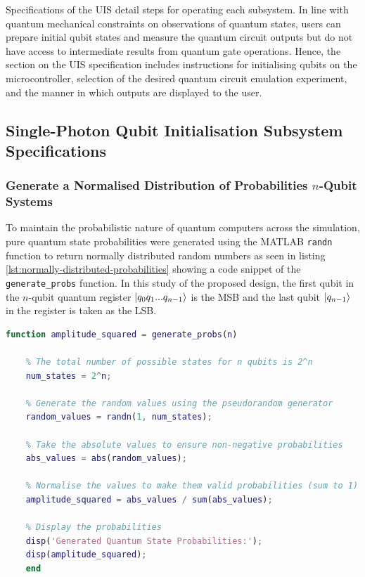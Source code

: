 Specifications of the UIS detail steps for operating each subsystem. In line with quantum mechanical constraints on observations of quantum states, users can prepare initial qubit states and measure the quantum circuit outputs but do not have access to intermediate results from quantum gate operations. Hence, the section on the UIS specification includes instructions for initialising qubits on the microcontroller, selection of the desired quantum circuit emulation experiment, and the manner in which outputs are displayed to the user. 

\subsection{Single-Photon Qubit Initialisation Subsystem Specifications \label{subsec:sqpis-specs}}

\subsubsection{Generate a Normalised Distribution of Probabilities $n$-Qubit Systems}

To maintain the probabilistic nature of quantum computers across the simulation, pure quantum state probabilities were generated using the MATLAB \texttt{randn} function to return normally distributed random numbers as seen in listing \ref{lst:normally-distributed-probabilities} showing a code snippet of the \texttt{generate\_probs} function. In this study of the proposed design, the first qubit in the $n$-qubit quantum register $\ket{q_0 q_1 ... q_{n-1}}$ is the MSB and the last qubit $\ket{q_{n-1}}$ in the register is taken as the LSB. 

\begin{lstlisting}[language=Matlab, caption={MATLAB script for generating pseudo random numbers for the probabilities associated with quantum states.}, label={lst:normally-distributed-probabilities}]
	function amplitude_squared = generate_probs(n)
	
	% The total number of possible states for n qubits is 2^n
	num_states = 2^n;
	
	% Generate the random values using the pseudorandom generator
	random_values = randn(1, num_states);
	
	% Take the absolute values to ensure non-negative probabilities
	abs_values = abs(random_values);
	
	% Normalise the values to make them valid probabilities (sum to 1)
	amplitude_squared = abs_values / sum(abs_values);
	
	% Display the probabilities
	disp('Generated Quantum State Probabilities:');
	disp(amplitude_squared);
	end
\end{lstlisting}

